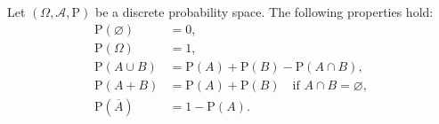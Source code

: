 Let $(\Omega, \mathcal{A}, \text{P})$ be a discrete probability space. The following properties hold:
\begin{align*}
\text{P}(\varnothing) &= 0, \\
\text{P}(\Omega) &= 1, \\
\text{P}(A \cup B) &= \text{P}(A) + \text{P}(B) - \text{P}(A \cap B), \\
\text{P}(A + B) &= \text{P}(A) + \text{P}(B) \quad \text{if } A \cap B = \varnothing, \\
\text{P}(\overline{A}) &= 1 - \text{P}(A).
\end{align*}
